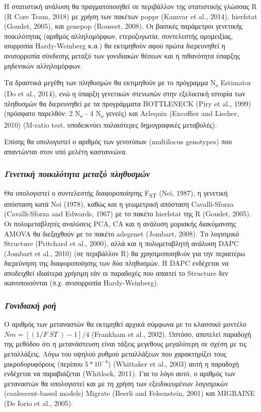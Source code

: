 \documentclass[12pt,a4paper,]{report}
\begin{document}
Η στατιστική ανάλυση θα πραγματοποιηθεί σε περιβάλλον της στατιστικής
γλώσσας R (R Core Team, 2018) με χρήση των πακέτων poppr (Kamvar et al.,
2014), hierfstat (Goudet, 2005), και genepop (Rousset, 2008). Οι βασικές
παράμετροι γενετικής ποικιλότητας (αριθμός αλληλομόρφων, ετεροζυγωτία,
συντελεστής ομομειξίας, ισορροπία Hardy-Weinberg κ.α.) θα εκτιμηθούν
αφού πρώτα διερευνηθεί η ανισορροπία σύνδεσης μεταξύ των γονιδιακών
θέσεων και η πιθανότητα ύπαρξης μηδενικών αλληλομόρφων.

Τα δραστικά μεγέθη των πληθυσμών θα εκτιμηθούν με το πρόγραμμα
N\textsubscript{e} Estimator (Do et al., 2014), ενώ η ύπαρξη γενετικών
στενωπών στην εξελικτική ιστορία των πληθυσμών θα διερευνηθεί με τα
προγράμματα BOTTLENECK (Piry et al., 1999) (πρόσφατο παρελθόν: 2
N\textsubscript{e} - 4 N\textsubscript{e} γενεές) και Arlequin
(Excoffier and Lischer, 2010) (M-ratio test, υποδεικνύει παλαιότερες
δημογραφικές μεταβολές).

Επίσης θα υπολογιστεί ο αριθμός των γενοτύπων (multilocus genotypes) που
απαντώνται στον υπό μελέτη καστανεώνα.

\hypertarget{---}{%
\subsubsection{\texorpdfstring{\emph{Γενετική ποικιλότητα μεταξύ
πληθυσμών}}{Γενετική ποικιλότητα μεταξύ πληθυσμών}}\label{---}}

Θα υπολογιστεί ο συντελεστής διαφοροποίησης F\textsubscript{ST} (Nei,
1987), η γενετική απόσταση κατά Nei (1978), καθώς και η γεωμετρική
απόσταση Cavalli-Sforza (Cavalli-Sforza and Edwards, 1967) με το πακέτο
hierfstat της R (Goudet, 2005). Οι πολυμεταβλητές αναλύσεις PCA, CA και
η ανάλυση μοριακής διακύμανσης AMOVA θα διεξαχθούν με το πακέτο adegenet
(Jombart, 2008). Το λογισμικό Structure (Pritchard et al., 2000), αλλά
και η πολυμεταβλητή ανάλυση DAPC (Jombart et al., 2010) (σε περιβάλλον
R) θα χρησιμοποιηθoύν για την περαιτέρω διερεύνηση της διαφοροποίησης
των δύο πληθυσμών. H DAPC ενδέχεται να αποδειχθεί ιδιαίτερα χρήσιμη εάν
οι παραδοχές που απαιτεί το Structure δεν ικανοποιούνται (π.χ.
ανισορροπία Hardy-Weinberg).

\hypertarget{-}{%
\subsubsection{\texorpdfstring{\emph{Γονιδιακή
ροή}}{Γονιδιακή ροή}}\label{-}}

Ο αριθμός των μεταναστών θα εκτιμηθεί αρχικά σύμφωνα με το κλασσικό
μοντέλο \(Nm = [(1 / F~ST~) - 1] / 4\) (Frankham et al., 2002). Ωστόσο,
αποτελεί παραδοχή της μεθόδου ότι η μετανάστευση είναι τάξεις μεγεθους
μεγαλύτερη σε σχέση με τις μεταλλάξεις. Λόγω του υψηλού ρυθμού
μεταλλάξεων που χαρακτηρίζει τους μικροδορυφόρους (περίπου
\(5 * 10^{-4}\)) (Whittaker et al., 2003) αυτή η παραδοχή ενδέχεται να
παραβιάζεται (Whitlock, 2011). Για το λόγο αυτό, ο αριθμός των
μεταναστών θα υπολογιστεί και με τη χρήση των εξειδικευμένων λογισμικών
(coalescent-based models) Migrate (Beerli and Felsenstein, 2001) και
MIGRAINE (De Iorio et al., 2005).
\end{document}
